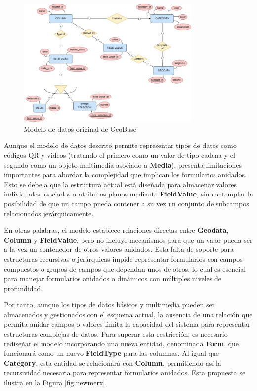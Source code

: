 \documentclass{article}
\begin{document}
\begin{figure}[H]
\centering
\includegraphics[width=0.8\textwidth]{images/old_merx.jpg}
\caption{Modelo de datos original de GeoBase}
\label{fig:oldmerx}
\end{figure}

Aunque el modelo de datos descrito permite representar tipos de datos como códigos QR y videos (tratando el primero como un valor de tipo cadena y el segundo como un objeto multimedia asociado a \textbf{Media}), presenta limitaciones importantes para abordar la complejidad que implican los formularios anidados. Esto se debe a que la estructura actual está diseñada para almacenar valores individuales asociados a atributos planos mediante \textbf{FieldValue}, sin contemplar la posibilidad de que un campo pueda contener a su vez un conjunto de subcampos relacionados jerárquicamente.

En otras palabras, el modelo establece relaciones directas entre \textbf{Geodata}, \textbf{Column} y \textbf{FieldValue}, pero no incluye mecanismos para que un valor pueda ser a la vez un contenedor de otros valores anidados. Esta falta de soporte para estructuras recursivas o jerárquicas impide representar formularios con campos compuestos o grupos de campos que dependan unos de otros, lo cual es esencial para manejar formularios anidados o dinámicos con múltiples niveles de profundidad.

Por tanto, aunque los tipos de datos básicos y multimedia pueden ser almacenados y gestionados con el esquema actual, la ausencia de una relación que permita anidar campos o valores limita la capacidad del sistema para representar estructuras complejas de datos. Para superar esta restricción, es necesario rediseñar el modelo incorporando una nueva entidad, denominada \textbf{Form}, que funcionará como un nuevo \textbf{FieldType} para las columnas. Al igual que \textbf{Category}, esta entidad se relacionará con \textbf{Column}, permitiendo así la recursividad necesaria para representar formularios anidados. Esta propuesta se ilustra en la Figura \ref{fig:newmerx}.
\end{document}
